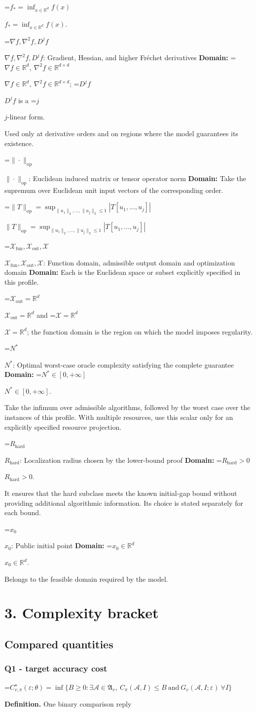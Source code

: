 \documentclass[10pt,a4paper]{article}
\newcommand{\AtlasMath}[1]{\par\begingroup\centering\setbox0=\hbox{$\displaystyle #1$}\ifdim\wd0>1.4\linewidth\typeout{ATLAS WIDE FORMULA: \the\wd0}\fi\ifdim\wd0>\linewidth\resizebox{\linewidth}{!}{\box0}\else\box0\fi\par\endgroup}
\newcommand{\AtlasInlineMath}[1]{\begingroup\setbox0=\hbox{$#1$}\ifdim\wd0>.4\linewidth\endgroup\AtlasMath{#1}\else\endgroup$#1$\fi}
\begin{document}
\AtlasInlineMath{f_*=\inf_{x\in \mathbb{R}^d}f(x)}.

\AtlasInlineMath{\nabla f,\nabla^2f,D^jf}: Gradient, Hessian, and higher Fréchet derivatives \textbf{Domain:} \AtlasInlineMath{\nabla f\in\mathbb{R}^d,\ \nabla^2f\in\mathbb{R}^{d\times d}}; \AtlasInlineMath{D^jf} is a \AtlasInlineMath{j}-linear form.

Used only at derivative orders and on regions where the model guarantees its existence.

\AtlasInlineMath{\|\cdot\|_{\mathrm{op}}}: Euclidean induced matrix or tensor operator norm \textbf{Domain:} Take the supremum over Euclidean unit input vectors of the corresponding order.

\AtlasInlineMath{\|T\|_{\mathrm{op}}=\sup_{\|u_1\|_2,\ldots,\|u_j\|_2\le1}|T[u_1,\ldots,u_j]|}

\AtlasInlineMath{\mathcal{X}_{\mathrm{fun}},\mathcal{X}_{\mathrm{out}},\mathcal{X}}: Function domain, admissible output domain and optimization domain \textbf{Domain:} Each is the Euclidean space or subset explicitly specified in this profile.

\AtlasInlineMath{\mathcal{X}_{\mathrm{out}}=\mathbb{R}^d} and \AtlasInlineMath{\mathcal{X}=\mathbb{R}^d}; the function domain is the region on which the model imposes regularity.

\AtlasInlineMath{N^*}: Optimal worst-case oracle complexity satisfying the complete guarantee \textbf{Domain:} \AtlasInlineMath{N^*\in[0,+\infty]}.

Take the infimum over admissible algorithms, followed by the worst case over the instances of this profile. With multiple resources, use this scalar only for an explicitly specified resource projection.

\AtlasInlineMath{R_{\mathrm{hard}}}: Localization radius chosen by the lower-bound proof \textbf{Domain:} \AtlasInlineMath{R_{\mathrm{hard}}>0}.

It ensures that the hard subclass meets the known initial-gap bound without providing additional algorithmic information. Its choice is stated separately for each bound.

\AtlasInlineMath{x_0}: Public initial point \textbf{Domain:} \AtlasInlineMath{x_0\in\mathbb{R}^d}.

Belongs to the feasible domain required by the model.

\section{3. Complexity bracket}
\subsection{Compared quantities}
\subsubsection{Q1 - target accuracy cost}
\AtlasMath{C^\star_{v,\pi}(\varepsilon;\theta)=\inf\{B\ge0:\exists\mathcal A\in\mathfrak A_v,\ C_\pi(\mathcal A,I)\le B\ \text{and}\ G_v(\mathcal A,I;\varepsilon)\ \forall I\}}
\textbf{Definition.} One binary comparison reply
\end{document}
